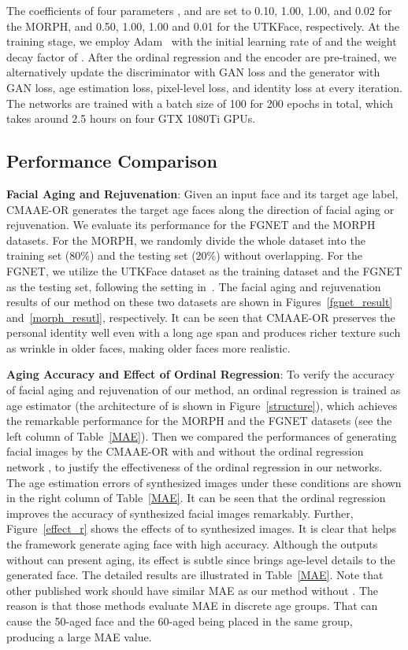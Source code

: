\documentclass{article}
\begin{document}
The coefficients of four parameters , and  are set to 0.10, 1.00, 1.00, and 0.02 for the MORPH, and 0.50, 1.00, 1.00 and 0.01 for the UTKFace, respectively. At the training stage, we employ Adam~\cite{kingma2014adam} with the initial learning rate of  and the weight decay factor of . After the ordinal regression  and the encoder  are pre-trained, we alternatively update the discriminator  with GAN loss and the generator  with GAN loss, age estimation loss, pixel-level loss, and identity loss at every iteration. The networks are trained with a batch size of 100 for 200 epochs in total, which takes around 2.5 hours on four GTX 1080Ti GPUs.

\subsection{Performance Comparison}
{\bf\noindent Facial Aging and Rejuvenation}:
Given an input face and its target age label, CMAAE-OR generates the target age faces along the direction of facial aging or rejuvenation. We evaluate its performance for the FGNET and the MORPH datasets. For the MORPH, we randomly divide the whole dataset into the training set (80\%) and the testing set (20\%) without overlapping. For the FGNET, we utilize the UTKFace dataset as the training dataset and the FGNET as the testing set, following the setting in~\cite{zhang2017age}. The facial aging and rejuvenation results of our method on these two datasets are shown in Figures~\ref{fgnet_result} and~\ref{morph_resutl}, respectively. It can be seen that CMAAE-OR preserves the personal identity well even with a long age span and produces richer texture such as wrinkle in older faces, making older faces more realistic. 

{\bf\noindent Aging Accuracy and Effect of Ordinal Regression}:
To verify the accuracy of facial aging and rejuvenation of our method, an ordinal regression  is trained as age estimator (the architecture of  is shown in Figure~\ref{structure}), which achieves the remarkable performance for the MORPH and the FGNET datasets (see the left column of Table~\ref{MAE}). Then we compared the performances of generating facial images by the CMAAE-OR with and without the ordinal regression network , to justify the effectiveness of the ordinal regression in our networks. The age estimation errors of synthesized images under these conditions are shown in the right column of Table~\ref{MAE}. It can be seen that the ordinal regression  improves the accuracy of synthesized facial images remarkably. Further, Figure~\ref{effect_r} shows the effects of  to synthesized images. It is clear that  helps the framework generate aging face with high accuracy. Although the outputs without  can present aging, its effect is subtle since  brings age-level details to the generated face. The detailed results are illustrated in Table~\ref{MAE}. Note that other published work should have similar MAE as our method without . The reason is that those methods evaluate MAE in discrete age groups. That can cause the 50-aged face and the 60-aged being placed in the same group, producing a large MAE value.  
\end{document}
